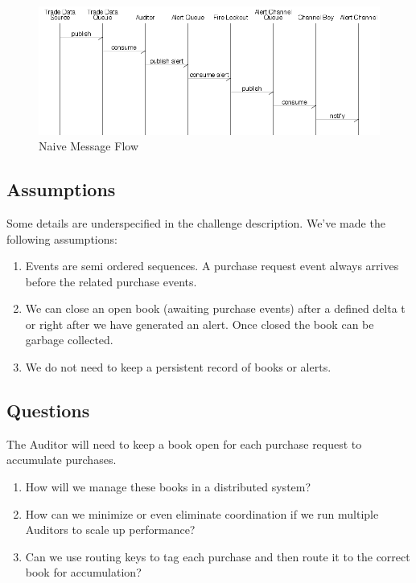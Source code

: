 \documentclass[captions=tableheading]{scrreprt}
\begin{document}
\begin{figure}[htb]
\centering
\includegraphics[width=14 cm]{Naive-Flow.png}
\caption{\label{fig:orgparagraph1}
Naive Message Flow}
\end{figure}

\subsection{Assumptions}
\label{sec:orgheadline9}
Some details are underspecified in the challenge description. We've
made the following assumptions:
\begin{enumerate}
\item Events are semi ordered sequences. A purchase request event always
arrives before the related purchase events.
\item We can close an open book (awaiting purchase events) after a
defined delta t or right after we have generated an alert. Once
closed the book can be garbage collected.
\item We do not need to keep a persistent record of books or alerts.
\end{enumerate}

\subsection{Questions}
\label{sec:orgheadline10}
The Auditor will need to keep a book open for each purchase request
to accumulate purchases. 
\begin{enumerate}
\item How will we manage these books in a distributed system?
\item How can we minimize or even eliminate coordination if we run
multiple Auditors to scale up performance?
\item Can we use routing keys to tag each purchase and then route it to
the correct book for accumulation?
\end{enumerate}
\end{document}
